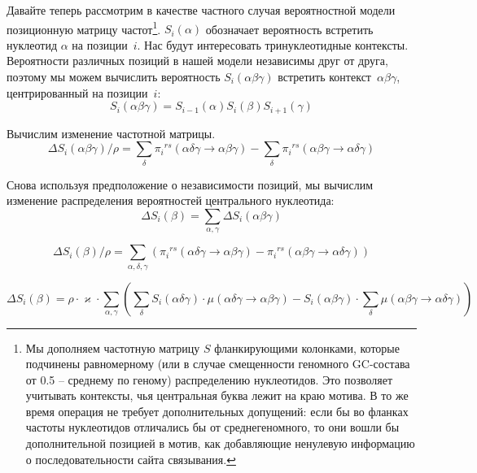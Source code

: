 \documentclass[a4paper]{article}
\newcommand\rs{{}^{rs}}
\begin{document}
Давайте теперь рассмотрим в качестве частного случая вероятностной модели позиционную матрицу частот\footnote{Мы дополняем частотную матрицу $S$ фланкирующими колонками, которые подчинены равномерному (или в случае смещенности геномного GC-состава от 0.5 -- среднему по геному) распределению нуклеотидов. Это позволяет учитывать контексты, чья центральная буква лежит на краю мотива. В то же время операция не требует дополнительных допущений: если бы во фланках частоты нуклеотидов отличались бы от среднегеномного, то они вошли бы дополнительной позицией в мотив, как добавляющие ненулевую информацию о последовательности сайта связывания.}.
$S_i(\alpha)$ обозначает вероятность встретить нуклеотид $\alpha$ на позиции~$i$. Нас будут интересовать тринуклеотидные контексты. Вероятности различных позиций в нашей модели независимы друг от друга, поэтому мы можем вычислить вероятность $S_i(\alpha\beta\gamma)$ встретить контекст~$\alpha\beta\gamma$, центрированный на позиции~$i$:
\begin{equation*}
S_i(\alpha\beta\gamma) = S_{i-1}(\alpha)S_i(\beta)S_{i+1}(\gamma)
\end{equation*}

Вычислим изменение частотной матрицы.
\begin{equation}
\Delta S_i(\alpha\beta\gamma) / \rho = \sum_{\delta} \pi_i\rs(\alpha\delta\gamma \to \alpha\beta\gamma) - \sum_{\delta} \pi_i\rs(\alpha\beta\gamma \to \alpha\delta\gamma)
\end{equation}

Снова используя предположение о независимости позиций, мы вычислим изменение распределения вероятностей центрального нуклеотида:
\begin{equation}
\Delta S_i(\beta) = \sum_{\alpha, \gamma}\Delta S_i(\alpha\beta\gamma)
\end{equation}

\begin{equation}
\Delta S_i(\beta) / \rho = \sum_{\alpha,\delta,\gamma}\left(\pi_i\rs(\alpha\delta\gamma \to \alpha\beta\gamma) - \pi_i\rs(\alpha\beta\gamma \to \alpha\delta\gamma)\right)
\end{equation}



\begin{equation}
\boxed{
\Delta S_i(\beta)  = \rho\cdot\varkappa\cdot\sum_{\alpha,\gamma}\left(\sum_{\delta}S_i(\alpha\delta\gamma)\cdot\mu(\alpha\delta\gamma \to \alpha\beta\gamma) - S_i(\alpha\beta\gamma)\cdot\sum_{\delta}\mu(\alpha\beta\gamma \to \alpha\delta\gamma)\right)
}
\end{equation}
\end{document}
